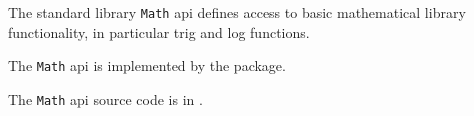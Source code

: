 
The standard library {\tt Math} api defines access to basic mathematical library 
functionality, in particular trig and log functions.

The {\tt Math} api is implemented by the  package.

The {\tt Math} api source code is in .

